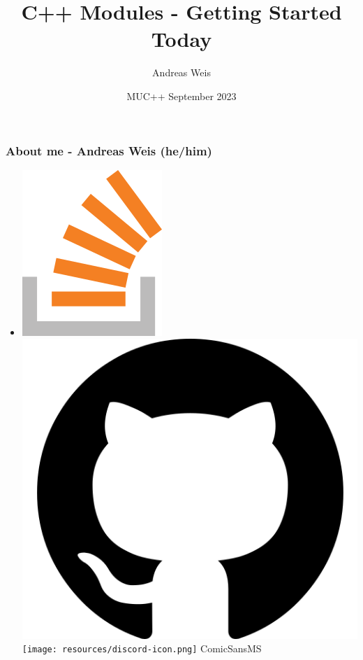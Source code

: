 \documentclass[aspectratio=169]{beamer}
\title{C++ Modules - Getting Started Today}
\author{Andreas Weis}
\institute{Woven by Toyota}
\date{MUC++ September 2023}
\begin{document}
\frame{\titlepage}

\iftrue %
\fi

\begin{frame}[fragile]
  \frametitle{About me - Andreas Weis (he/him)}

  \begin{itemize}
    \setlength\itemsep{1.5em}

    \item \href{https://stackoverflow.com/users/577603/comicsansms}{\includegraphics[height=.05\textheight]{resources/so-icon.png}} \href{https://github.com/ComicSansMS}{\includegraphics[height=.05\textheight]{resources/github-icon.png}} \texttt{[image: resources/discord-icon.png]} ComicSansMS



\end{itemize}
\end{frame}
\end{document}
